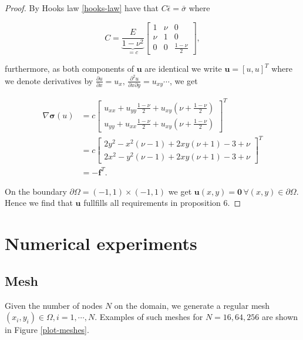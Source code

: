 \documentclass[11pt,a4paper,english]{elsarticle}%
\begin{document}
\begin{proof}
By Hooks law \eqref{hooks-law} have that $C \bar{\epsilon} = \bar{\sigma}$ where 

\begin{equation*}
    C = \underbrace{\frac{E}{1-\nu^2}}_{=c}\begin{bmatrix}
        1&\nu&0\\
        \nu&1&0\\
        0&0&\frac{1-\nu}{2}
    \end{bmatrix},
\end{equation*}

furthermore, as both components of $\bm u$ are identical we write $\bm u = [u,u]^T$ where we denote derivatives by $\frac{\partial u}{\partial x} = u_x, \, \frac{\partial^2 u}{\partial x \partial y} = u_{xy} \cdots$,
we get

\begin{align}
    \nabla\bm\sigma(u) &= 
    c\begin{bmatrix}
        u_{xx} + u_{yy}\frac{1-\nu}{2} + u_{xy}(\nu + \frac{1-\nu}{2})\\
        u_{yy} + u_{xx}\frac{1-\nu}{2} + u_{xy}(\nu + \frac{1-\nu}{2})
    \end{bmatrix}^T\\
    &= c\begin{bmatrix}
        2y^2 - x^2(\nu - 1) +2xy(\nu +1) - 3 + \nu \\
        2x^2 - y^2(\nu - 1) +2xy(\nu +1) - 3 + \nu
    \end{bmatrix}^T\\
    &= -\bm f^T.
\end{align}

On the boundary $\partial \Omega = (-1,1)\times(-1,1)$ we get $\bm u(x,y) = \bm 0 \, \forall (x,y) \in \partial \Omega$.
Hence we find that $\bm u$ fullfills all requirements in proposition 6.  
\end{proof}
    


\section{Numerical experiments}
\subsection{Mesh}
Given the number of nodes $N$ on the domain, we generate a regular mesh $(x_i,y_i) \in \Omega, i = 1,\cdots,N$.
Examples of such  meshes for $N = 16,64,256$ are shown in Figure \ref{plot-meshes}.
\end{document}
